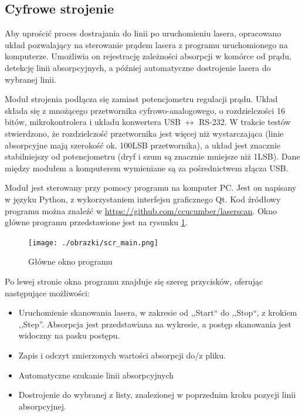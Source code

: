 \documentclass[a4paper,10pt]{article}
\begin{document}
\subsection{Cyfrowe strojenie}

Aby uprościć proces dostrajania do linii po uruchomieniu lasera, opracowano układ pozwalający na sterowanie prądem lasera z programu uruchomionego na komputerze.
Umożliwia on rejestrację zależności absorpcji w komórce od prądu, detekcję linii absorpcyjnych, a później automatyczne dostrojenie lasera do wybranej linii.

Moduł strojenia podłącza się zamiast potencjometru regulacji prądu. Układ składa się z mnożącego przetwornika cyfrowo-analogowego, o rozdzielczości 16 bitów, mikrokontrolera i układu konwertera USB $\leftrightarrow$ RS-232. W trakcie testów stwierdzono, że rozdzielczość przetwornika jest więcej niż wystarczająca (linie absorpcyjne mają szerokość ok. 100LSB przetwornika), a układ jest znacznie stabilniejszy od potencjometru (dryf i szum są znacznie mniejsze niż 1LSB). Dane między modułem a komputerem wymieniane są za pośrednictwem złącza USB.

Moduł jest sterowany przy pomocy programu na komputer PC. Jest on napisany w języku Python, z wykorzystaniem interfejsu graficznego Qt. Kod źródłowy programu można znaleźć w \url{https://github.com/ccucumber/laserscan}. Okno główne programu przedstawione jest na rysunku \ref{scr-main}.

\begin{figure}
\begin{center}
 \texttt{[image: ./obrazki/scr\_main.png]}
\end{center}
\caption{Główne okno programu}
\label{scr-main}
\end{figure}


Po lewej stronie okna programu znajduje się szereg przycisków, oferując następujące możliwości:

\begin{itemize}
 \item Uruchomienie skanowania lasera, w zakresie od ,,Start`` do ,,Stop``, z krokiem ,,Step''. Absorpcja jest przedstawiana na wykresie, a postęp skanowania jest widoczny na pasku postępu.
 \item Zapis i odczyt zmierzonych wartości absorpcji do/z pliku.
 \item Automatyczne szukanie linii absorpcyjnych
 \item Dostrojenie do wybranej z listy, znalezionej w poprzednim kroku pozycji linii absorpcyjnej.
\end{itemize}
\end{document}
